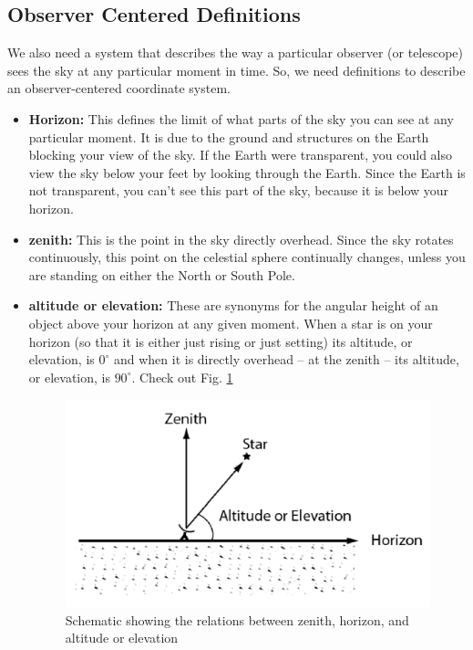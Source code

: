 \documentclass[10pt]{report}
\begin{document}
\subsection{Observer Centered Definitions}
We also need a system that describes the way a particular observer (or telescope) sees the sky at any particular moment in time.  So, we need definitions to describe an observer-centered coordinate system. 
\begin{itemize}
\item \textbf{Horizon:} This defines the limit of what parts of the sky you can see at any particular moment.  It is due to the ground and structures on the Earth blocking your view of the sky.  If the Earth were transparent, you could also view the sky below your feet by looking through the Earth.  Since the Earth is not transparent, you can't see this part of the sky, because it is below your horizon.   
\item \textbf{zenith:} This is the point in the sky directly overhead.  Since the sky rotates continuously, this point on the celestial sphere continually changes, unless you are standing on either the North or South Pole.   
\item \textbf{altitude or elevation:} These are synonyms for the angular height of an object above your horizon at any given moment.  When a star is on your horizon (so that it is either just rising or just setting) its altitude, or elevation, is $0^\circ$ and when it is directly overhead – at the zenith -- its altitude, or elevation, is $90^\circ$. Check out Fig. \ref{altel}
\begin{figure}\label{altel}
\includegraphics[width=\linewidth]{altel.png}
\caption{Schematic showing the relations between zenith, horizon, and altitude or elevation}
\end{figure}

\end{itemize}
\end{document}
